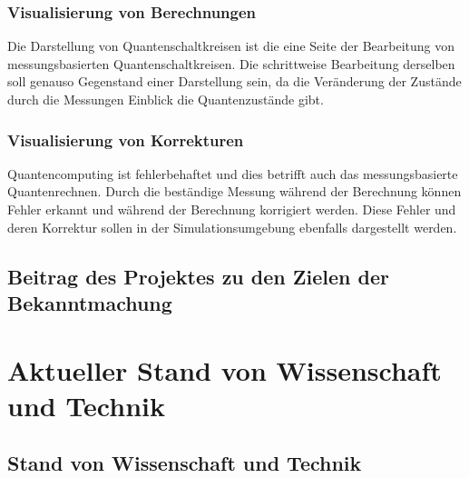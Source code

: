 \documentclass[11pt, a4paper]{article}
\newcommand{\instruction}[1]{{}}
\begin{document}
\subsubsection{Visualisierung von Berechnungen}

Die Darstellung von Quantenschaltkreisen ist die eine Seite der
Bearbeitung von messungsbasierten Quantenschaltkreisen. Die
schrittweise Bearbeitung derselben soll genauso Gegenstand einer
Darstellung sein, da die Veränderung der Zustände durch die Messungen
Einblick die Quantenzustände gibt.

\subsubsection{Visualisierung von Korrekturen}

Quantencomputing ist fehlerbehaftet und dies betrifft auch das
messungsbasierte Quantenrechnen. Durch die beständige Messung während
der Berechnung können Fehler erkannt und während der Berechnung
korrigiert werden. Diese Fehler und deren Korrektur sollen in der
Simulationsumgebung ebenfalls dargestellt werden.


\subsection{Beitrag des Projektes zu den Zielen der Bekanntmachung}

\instruction{Bezug zu Förderzielen und Stärkung des Open Innovation Ansatzes.} 

\section{Aktueller Stand von Wissenschaft und Technik}

\subsection{Stand von Wissenschaft und Technik}

\instruction{Hier bitte bereits bestehende sowie konkurrierende
  Technologien beschreiben (noch nicht den vorgeschlagenen neuen
  Lösungsansatz)}

\instruction{Welche alternativen Ansätze/Lösungswege existieren?}

\instruction{Technische Spezifikationen und Darstellung der
  Konkurrenzsituation}

\instruction{Benennung mindestens eines konkreten
  Anwendungsfalls/Projekts, bei dem die aktuelle Gerätetechnik an ihre
  Grenzen stößt (bezüglich technischer Spezifikationen,
  Zuverlässigkeit, Reproduzierbarkeit und/oder Verfügbarkeit) sowie
  geplante Folgeaktivitäten im Anwendungsfall/Projekt mit der dann
  neuen Gerätetechnik.}
\end{document}
